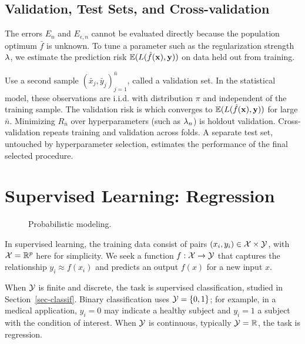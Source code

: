 \subsection{Validation, Test Sets, and Cross-validation}

The errors $E_n$ and $E_{\epsilon,n}$ cannot be evaluated directly because the population optimum $\bar f$ is unknown.
%
To tune a parameter such as the regularization strength $\lambda$, we estimate the prediction risk $\mathbb{E}(L(\hat f(\mathbf{x}),\mathbf{y}))$ on data held out from training.

%
Use a second sample $(\bar x_j,\bar y_j)_{j=1}^{\bar n}$, called a validation set. In the statistical model, these observations are i.i.d. with distribution $\pi$ and independent of the training sample. The validation risk is
which converges to $\mathbb{E}(L(\hat f(\mathbf{x}),\mathbf{y}))$ for large $\bar n$.
%
Minimizing $R_{\bar n}$ over hyperparameters (such as $\lambda_n$) is holdout validation. Cross-validation repeats training and validation across folds. A separate test set, untouched by hyperparameter selection, estimates the performance of the final selected procedure.


\section{Supervised Learning: Regression}
\label{sec-regression}

\begin{figure}[tbp]
\centering
{}
\caption{Probabilistic modeling.}
\label{fig-review-ml-joint-model}
\end{figure}
In supervised learning, the training data consist of pairs $(x_i,y_i)\in\mathcal{X}\times\mathcal{Y}$, with $\mathcal{X}=\mathbb{R}^p$ here for simplicity. We seek a function $f:\mathcal{X}\rightarrow\mathcal{Y}$ that captures the relationship $y_i\approx f(x_i)$ and predicts an output $f(x)$ for a new input $x$.

When $\mathcal{Y}$ is finite and discrete, the task is supervised classification, studied in Section~\ref{sec-classif}. Binary classification uses $\mathcal{Y}=\{0,1\}$; for example, in a medical application, $y_i=0$ may indicate a healthy subject and $y_i=1$ a subject with the condition of interest.
%
When $\mathcal{Y}$ is continuous, typically $\mathcal{Y}=\mathbb{R}$, the task is regression.

